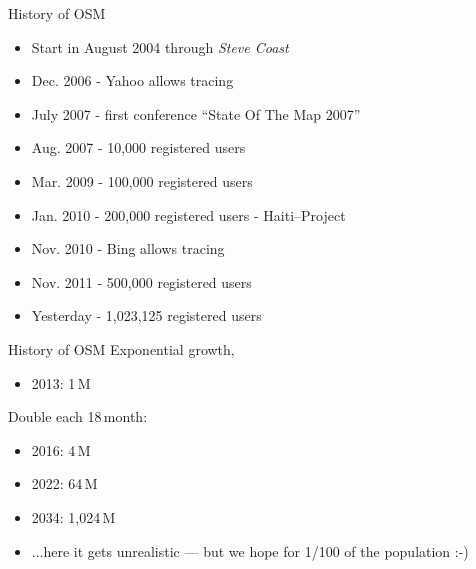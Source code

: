 \documentclass{beamer}
\begin{document}
{

\begin{frame}{History of OSM}
  \vspace{1.2cm}
\begin{itemize}
  \item Start in August 2004 through \emph{Steve Coast}
  \item Dec. 2006 - Yahoo allows tracing
  \item July 2007 - first conference ``State Of The Map 2007''
  \item Aug. 2007 - 10,000 registered users
  \item Mar. 2009 - 100,000 registered users
  \item Jan. 2010 - 200,000 registered users - Haiti--Project
  \item Nov. 2010 - Bing allows tracing
  \item Nov. 2011 - 500,000 registered users
  \item Yesterday - 1,023,125 registered users
\end{itemize}

\end{frame}

\begin{frame}{History of OSM}
  \vspace{1.2cm}
  Exponential growth, 
\begin{itemize}
   \item 2013: 1\,M
\end{itemize}
  Double each 18\,month: 
\begin{itemize}
     \pause
   \item 2016: 4\,M
     \pause
   \item 2022: 64\,M
     \pause
   \item 2034: 1,024\,M
   \item ...here it gets unrealistic --- but we hope for 1/100 of the population :-)
\end{itemize}

\end{frame}
}
\end{document}
